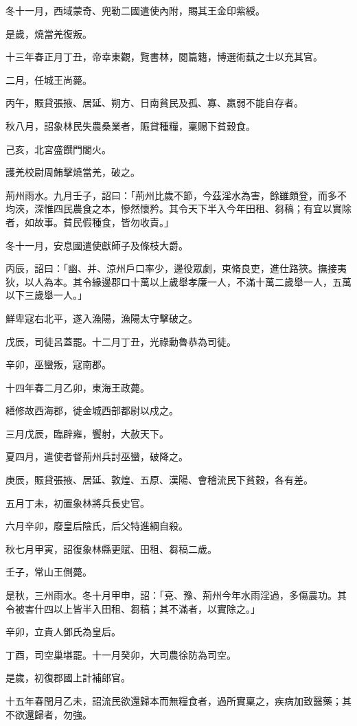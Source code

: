 \begin{pinyinscope}
冬十一月，西域蒙奇、兜勒二國遣使內附，賜其王金印紫綬。

是歲，燒當羌復叛。

十三年春正月丁丑，帝幸東觀，覽書林，閱篇籍，博選術蓺之士以充其官。

二月，任城王尚薨。

丙午，賑貸張掖、居延、朔方、日南貧民及孤、寡、羸弱不能自存者。

秋八月，詔象林民失農桑業者，賑貸種糧，稟賜下貧穀食。

己亥，北宮盛饌門閣火。

護羌校尉周鮪擊燒當羌，破之。

荊州雨水。九月壬子，詔曰：「荊州比歲不節，今茲淫水為害，餘雖頗登，而多不均浹，深惟四民農食之本，慘然懷矜。其令天下半入今年田租、芻稿；有宜以實除者，如故事。貧民假種食，皆勿收責。」

冬十一月，安息國遣使獻師子及條枝大爵。

丙辰，詔曰：「幽、并、涼州戶口率少，邊役眾劇，束脩良吏，進仕路狹。撫接夷狄，以人為本。其令緣邊郡口十萬以上歲舉孝廉一人，不滿十萬二歲舉一人，五萬以下三歲舉一人。」

鮮卑寇右北平，遂入漁陽，漁陽太守擊破之。

戊辰，司徒呂蓋罷。十二月丁丑，光祿勳魯恭為司徒。

辛卯，巫蠻叛，寇南郡。

十四年春二月乙卯，東海王政薨。

繕修故西海郡，徙金城西部都尉以戍之。

三月戊辰，臨辟雍，饗射，大赦天下。

夏四月，遣使者督荊州兵討巫蠻，破降之。

庚辰，賑貸張掖、居延、敦煌、五原、漢陽、會稽流民下貧穀，各有差。

五月丁未，初置象林將兵長史官。

六月辛卯，廢皇后陰氏，后父特進綱自殺。

秋七月甲寅，詔復象林縣更賦、田租、芻稿二歲。

壬子，常山王側薨。

是秋，三州雨水。冬十月甲申，詔：「兗、豫、荊州今年水雨淫過，多傷農功。其令被害什四以上皆半入田租、芻稿；其不滿者，以實除之。」

辛卯，立貴人鄧氏為皇后。

丁酉，司空巢堪罷。十一月癸卯，大司農徐防為司空。

是歲，初復郡國上計補郎官。

十五年春閏月乙未，詔流民欲還歸本而無糧食者，過所實稟之，疾病加致醫藥；其不欲還歸者，勿強。


\end{pinyinscope}
